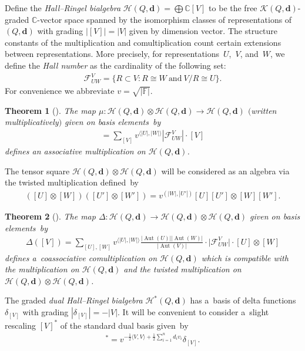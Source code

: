 \documentclass[11pt]{article}
\numberwithin{equation}{section}
\newtheorem{Theorem}{Theorem}[section]
\begin{document}
Def\/ine the \emph{Hall--Ringel bialgebra} $\mathcal{H}(Q,\mathbf{d})=\bigoplus\mathbb{C}[V]$ to be the free
$\mathcal{K}(Q,\mathbf{d})$-graded $\mathbb{C}$-vector space spanned by the isomorphism classes of representations of
$(Q,\mathbf{d})$ with grading $|[V]|=|V|$ given by dimension vector.
The structure constants of the multiplication and comultiplication count certain extensions between representations.
More precisely, for representations~$U$,~$V$, and~$W$, we def\/ine the \emph{Hall number} as the cardinality of the
following set:
\begin{gather*}
\mathcal{F}_{UW}^V=\{R\subset V: R\cong W \ \text{and} \  V/R\cong U\}.
\end{gather*}
For convenience we abbreviate $v=\sqrt{|\mathbb{F}|}$.
\begin{Theorem}[\cite{ringel2}]
The map $\mu: \mathcal{H}(Q,\mathbf{d})\otimes\mathcal{H}(Q,\mathbf{d})\to\mathcal{H}(Q,\mathbf{d})$ $($written
multiplicatively$)$ given on basis elements~by
\begin{gather*}
[U][W]=\sum\limits_{[V]}v^{\langle |U|,|W|\rangle} |\mathcal{F}_{UW}^V|\cdot[V]
\end{gather*}
defines an associative multiplication on $\mathcal{H}(Q,\mathbf{d})$.
\end{Theorem}
The tensor square $\mathcal{H}(Q,\mathbf{d})\otimes\mathcal{H}(Q,\mathbf{d})$ will be considered as an algebra via the
twisted multiplication def\/ined~by
\begin{gather*}
([U]\otimes[W])([U']\otimes[W'])=v^{(|W|,|U'|)}[U][U']\otimes[W][W'].
\end{gather*}

\begin{Theorem}[\cite{green}]\label{th:hall_comult}
The map $\Delta: \mathcal{H}(Q,\mathbf{d})\to\mathcal{H}(Q,\mathbf{d})\otimes\mathcal{H}(Q,\mathbf{d})$ given on basis
elements~by
\begin{gather*}
\Delta([V])=\sum\limits_{[U],[W]}v^{\langle |U|,|W|\rangle}
\frac{|\operatorname{Aut}(U)||\operatorname{Aut}(W)|}{|\operatorname{Aut}(V)|}\cdot\big|\mathcal{F}_{UW}^V\big|\cdot[U]\otimes[W]
\end{gather*}
defines a~coassociative comultiplication on $\mathcal{H}(Q,\mathbf{d})$ which is compatible with the multiplication on
$\mathcal{H}(Q,\mathbf{d})$ and the twisted multiplication on
$\mathcal{H}(Q,\mathbf{d})\otimes\mathcal{H}(Q,\mathbf{d})$.
\end{Theorem}

The graded \emph{dual Hall--Ringel bialgebra} $\mathcal{H}^*(Q,\mathbf{d})$ has a~basis of delta functions
$\delta_{[V]}$ with grading $|\delta_{[V]}|=-|V|$.
It will be convenient to consider a~slight rescaling $[V]^*$ of the standard dual basis given~by
\begin{gather*}
[V]^*=v^{-\frac{1}{2}\langle V,V\rangle+\frac{1}{2}\sum\limits_{i=1}^nd_iv_i}\delta_{[V]}.
\end{gather*}
\end{document}
